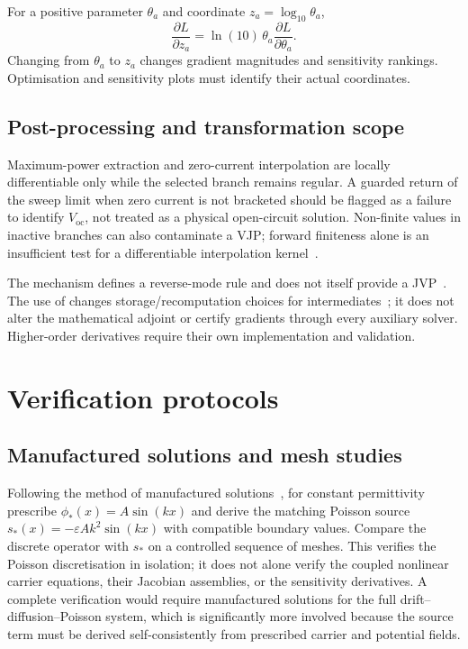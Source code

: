\documentclass[11pt,a4paper]{article}
\numberwithin{equation}{section}
\begin{document}
For a positive parameter $\theta_a$ and coordinate
$z_a=\log_{10}\theta_a$,
\begin{equation}
\frac{\partial L}{\partial z_a}
=\ln(10)\,\theta_a\frac{\partial L}{\partial\theta_a}.
\end{equation}
Changing from $\theta_a$ to $z_a$ changes gradient magnitudes and
sensitivity rankings. Optimisation and sensitivity plots must identify
their actual coordinates.

\subsection{Post-processing and transformation scope}
Maximum-power extraction and zero-current interpolation are locally
differentiable only while the selected branch remains regular. A guarded
return of the sweep limit when zero current is not bracketed should be
flagged as a failure to identify $V_{\mathrm{oc}}$, not treated as a
physical open-circuit solution. Non-finite values in inactive branches
can also contaminate a VJP; forward finiteness alone is an insufficient
test for a differentiable interpolation kernel~\cite{jaxfaq}.

The  mechanism defines a reverse-mode rule and does not
itself provide a JVP~\cite{jaxcustomvjp}. The use of
 changes storage/recomputation choices for
intermediates~\cite{jaxcheckpoint}; it does not alter the mathematical
adjoint or certify gradients through every auxiliary solver. Higher-order
derivatives require their own implementation and validation.

\section{Verification protocols}\label{supp:verification}
\subsection{Manufactured solutions and mesh studies}
Following the method of manufactured solutions~\cite{salari2000},
for constant permittivity prescribe
$\phi_*(x)=A\sin(kx)$ and derive the matching Poisson source
$s_*(x)=-\varepsilon Ak^2\sin(kx)$ with compatible boundary values.
Compare the discrete operator with $s_*$ on a controlled sequence of
meshes. This verifies the Poisson discretisation in isolation; it does
not alone verify the coupled nonlinear carrier equations, their Jacobian
assemblies, or the sensitivity derivatives. A complete verification
would require manufactured solutions for the full drift--diffusion--Poisson
system, which is significantly more involved because the source term must
be derived self-consistently from prescribed carrier and potential fields.
\end{document}
